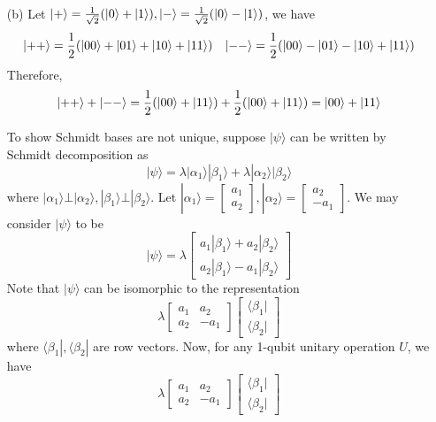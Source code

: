 \begin{enumerate}
\begin{enumerate}
    \item[(b)] Let $|{\sf +}\rangle = \frac{1}{\sqrt{2}}(|0\rangle + |1\rangle), |{\sf -}\rangle = \frac{1}{\sqrt{2}}(|0\rangle - |1\rangle)$, we have
    \[
    |{\sf ++}\rangle = \frac{1}{2}(|00\rangle + |01\rangle + |10\rangle + |11\rangle) \quad |{\sf --}\rangle = \frac{1}{2}(|00\rangle - |01\rangle - |10\rangle + |11\rangle)
    \]
    Therefore,
    \[
    |{\sf ++}\rangle + |{\sf --}\rangle = \frac{1}{2}(|00\rangle + |11\rangle) + \frac{1}{2}(|00\rangle + |11\rangle) = |00\rangle + |11\rangle
    \]

    To show Schmidt bases are not unique, suppose $| \psi \rangle$ can be written by Schmidt decomposition as
    \[
    | \psi \rangle = \lambda |\alpha_1\rangle |\beta_1 \rangle + \lambda |\alpha_2\rangle |\beta_2 \rangle
    \]
    where $|\alpha_1 \rangle \bot |\alpha_2\rangle, |\beta_1 \rangle \bot |\beta_2\rangle$. Let $|\alpha_1\rangle = \begin{bmatrix} a_1 \\ a_2  \end{bmatrix}, |\alpha_2\rangle = \begin{bmatrix} a_2 \\ -a_1  \end{bmatrix}$. We may consider $|\psi\rangle$ to be
    \[
    |\psi\rangle = \lambda \begin{bmatrix}
        a_1 |\beta_1\rangle + a_2 |\beta_2\rangle \\
        a_2 |\beta_1\rangle - a_1 |\beta_2\rangle
    \end{bmatrix}
    \]
    Note that $|\psi\rangle$ can be isomorphic to the representation
    \[
    \lambda \begin{bmatrix}
        a_1 & a_2  \\
        a_2 & -a_1
    \end{bmatrix}
     \begin{bmatrix}
        \langle \beta_1 |  \\
        \langle \beta_2 |
    \end{bmatrix}
    \]
    where $\langle \beta_1 |, \langle \beta_2 |$ are row vectors. Now, for any 1-qubit unitary operation $U$, we have
    \[
        \lambda \begin{bmatrix}
        a_1 & a_2  \\
        a_2 & -a_1
    \end{bmatrix}
     \begin{bmatrix}
        \langle \beta_1 |  \\
        \langle \beta_2 |

\end{bmatrix}\]
\end{enumerate}
\end{enumerate}
